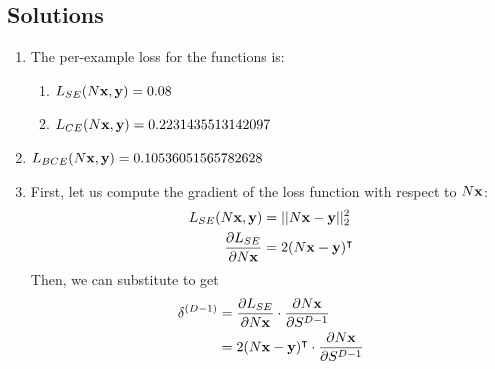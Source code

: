 \subsection{Solutions}
\begin{enumerate}
    \item The per-example loss for the functions is:
    \begin{enumerate}
        \item $L_{SE}(N\vx, \vy) = 0.08$
        \item $L_{CE}(N\vx, \vy) = 0.2231435513142097$
    \end{enumerate}
    \item $L_{BCE}(N\vx, \vy) = 0.10536051565782628$
    \item First, let us compute the gradient of the loss function with respect to $N\vx$:
    \begin{align*}
        L_{SE}(N\vx,\vy) &= ||N\vx-\vy||_{2}^{2} \\
        \frac{\partial L_{SE}}{\partial N\vx} &= 2(N\vx-\vy)^\intercal
    \end{align*}
    Then, we can substitute to get
    \begin{align*}
        \delta^{(D-1)} &= \frac{\partial L_{SE}}{\partial N\vx}\cdot\frac{\partial N\vx}{\partial S^{D-1}} \\
        &= 2(N\vx-\vy)^\intercal\cdot\frac{\partial N\vx}{\partial S^{D-1}}
    \end{align*}
\end{enumerate}